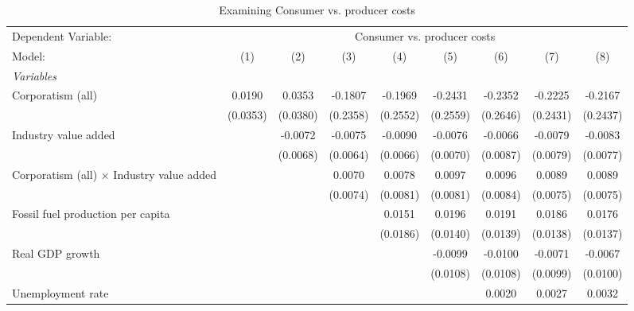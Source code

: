 
\begin{table}[htbp]
   \caption{Examining Consumer vs. producer costs}
   \centering
   \begin{tabular}{lcccccccc}
      \tabularnewline \midrule \midrule
      Dependent Variable: & \multicolumn{8}{c}{Consumer vs. producer costs}\\
      Model:                                           & (1)      & (2)      & (3)      & (4)      & (5)      & (6)      & (7)      & (8)\\  
      \midrule
      \emph{Variables}\\
      Corporatism (all)                                & 0.0190   & 0.0353   & -0.1807  & -0.1969  & -0.2431  & -0.2352  & -0.2225  & -0.2167\\   
                                                       & (0.0353) & (0.0380) & (0.2358) & (0.2552) & (0.2559) & (0.2646) & (0.2431) & (0.2437)\\   
      Industry value added                             &          & -0.0072  & -0.0075  & -0.0090  & -0.0076  & -0.0066  & -0.0079  & -0.0083\\   
                                                       &          & (0.0068) & (0.0064) & (0.0066) & (0.0070) & (0.0087) & (0.0079) & (0.0077)\\   
      Corporatism (all) $\times$ Industry value added  &          &          & 0.0070   & 0.0078   & 0.0097   & 0.0096   & 0.0089   & 0.0089\\   
                                                       &          &          & (0.0074) & (0.0081) & (0.0081) & (0.0084) & (0.0075) & (0.0075)\\   
      Fossil fuel production per capita                &          &          &          & 0.0151   & 0.0196   & 0.0191   & 0.0186   & 0.0176\\   
                                                       &          &          &          & (0.0186) & (0.0140) & (0.0139) & (0.0138) & (0.0137)\\   
      Real GDP growth                                  &          &          &          &          & -0.0099  & -0.0100  & -0.0071  & -0.0067\\   
                                                       &          &          &          &          & (0.0108) & (0.0108) & (0.0099) & (0.0100)\\   
      Unemployment rate                                &          &          &          &          &          & 0.0020   & 0.0027   & 0.0032\\   

\end{tabular}
\end{table}
